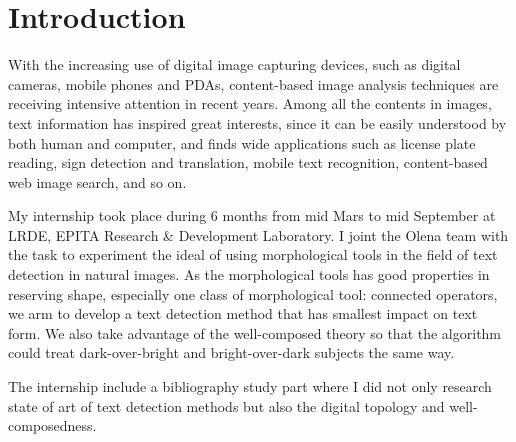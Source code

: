 
\graphicspath{ {1chapterIntroduction/image/} }
\chapter{Introduction}

With the increasing use of digital image capturing devices, such as digital cameras, mobile phones and PDAs, content-based image analysis techniques are receiving intensive attention in recent years. Among all the contents in images, text information has inspired great interests, since it can be easily understood by both human and computer, and finds
wide applications such as license plate reading, sign detection and translation, mobile text recognition, content-based web image search, and so on.


My internship took place during 6 months from mid Mars to mid September at LRDE, EPITA Research & Development Laboratory. I joint the Olena team with the task to experiment the ideal of using morphological tools in the field of text detection in natural images. As the morphological tools has good properties in reserving shape, especially one class of morphological tool: connected operators, we arm to develop a text detection method that has smallest impact on text form. We also take advantage of the well-composed theory so that the algorithm could treat dark-over-bright and bright-over-dark subjects the same way.


The internship include a bibliography study part where I did not only research state of art of text detection methods but also the digital topology and well-composedness.